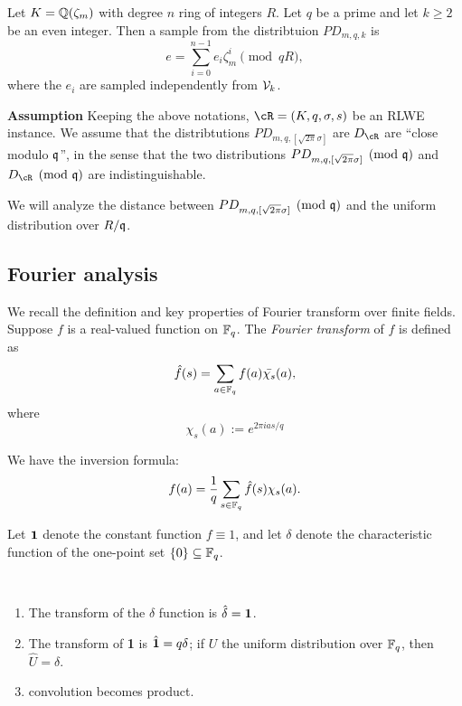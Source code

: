 \documentclass{amsart}
\begin{document}
\begin{Definition}
Let $K = \mathbb{Q}(\zeta_m)$ with degree $n$ ring of integers $R$. Let $q$ be a prime and let $k \geq 2$ be an even integer. Then a sample from the distribtuion $PD_{m,q,k}$ is
\[
    e = \sum_{i=0}^{n-1} e_i \zeta_m^{i} \pmod{qR},
\]
where the $e_i$ are sampled independently from $\mathcal{V}_k$.
\end{Definition}

{\bf Assumption} Keeping the above notations, $\cR = (K, q, \sigma, s)$ be an RLWE instance. We assume that the distribtutions $PD_{m,q,[\sqrt{2\pi}\sigma]}$ are $D_\cR$ are ``close modulo $\mathfrak{q}$'', in the sense that the two distributions $PD_{m,q,[\sqrt{2\pi}\sigma]} \pmod{\mathfrak{q}}$ and
$D_\cR \pmod{\fq}$ are indistinguishable.

We will analyze the distance between $PD_{m,q,[\sqrt{2\pi}\sigma]} \pmod{\mathfrak{q}}$ and the uniform distribution over $R/\mathfrak{q}$.

\subsection{Fourier analysis}
We recall the definition and key properties of Fourier transform over finite fields.
Suppose $f$ is a real-valued function on $\mathbb{F}_q$. The {\it Fourier transform} of $f$ is defined as
\[
    \hat{f}(s) = \sum_{a \in \mathbb{F}_q} f(a) \bar{\chi_s}(a),
\]
where $$\chi_s(a) := e^{2 \pi i as/q}$$

We have the inversion formula:
\[
    f(a) = \frac{1}{q} \sum_{s \in \mathbb{F}_q} \hat{f}(s)\chi_s(a).
\]

Let ${\bf 1}$ denote the constant function $f \equiv 1$, and let $\delta$ denote the characteristic function of the
one-point set $\{0\} \subseteq \mathbb{F}_q$.

\begin{Prop} \hfill \\
\begin{enumerate}
\item The transform of the $\delta$ function is $\hat{\delta} = {\bf 1}$.

\item The transform of {\bf 1} is $\hat{{\bf 1}} = q\delta$; if $U$ the uniform distribution over $\mathbb{F}_q$, then $\hat{U} = \delta$.

\item convolution becomes product.


\end{enumerate}
\end{Prop}
\end{document}
